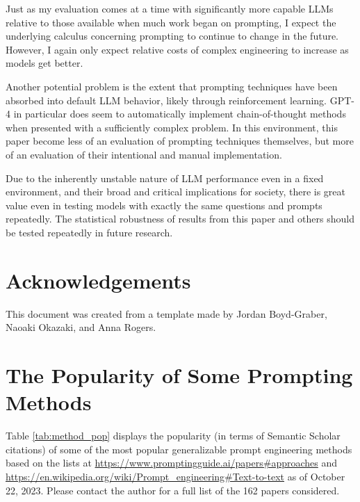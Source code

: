 \documentclass[11pt]{article}
\begin{document}
Just as my evaluation comes at a time with significantly more capable LLMs relative to those available when much work began on prompting, I expect the underlying calculus concerning prompting to continue to change in the future. However, I again only expect relative costs of complex engineering to increase as models get better.

Another potential problem is the extent that prompting techniques have been absorbed into default LLM behavior, likely through reinforcement learning. GPT-4 in particular does seem to automatically implement chain-of-thought methods when presented with a sufficiently complex problem. In this environment, this paper become less of an evaluation of prompting techniques themselves, but more of an evaluation of their intentional and manual implementation.

Due to the inherently unstable nature of LLM performance even in a fixed environment, and their broad and critical implications for society, there is great value even in testing models with exactly the same questions and prompts repeatedly. The statistical robustness of results from this paper and others should be tested repeatedly in future research.

\section*{Acknowledgements}
This document was created from a template made by Jordan Boyd-Graber, Naoaki Okazaki, and Anna Rogers.




\clearpage
\newpage

\onecolumn
\setlength{\parindent}{0cm}
\setlength\parskip{1em plus 0.1em minus 0.2em}
\appendix

\section{The Popularity of Some Prompting Methods}
\label{sec:popularity}

Table \ref{tab:method_pop} displays the popularity (in terms of Semantic Scholar citations) of some of the most popular generalizable prompt engineering methods based on the lists at \url{https://www.promptingguide.ai/papers#approaches} and \url{https://en.wikipedia.org/wiki/Prompt_engineering#Text-to-text} as of October 22, 2023. Please contact the author for a full list of the 162 papers considered.
\end{document}
